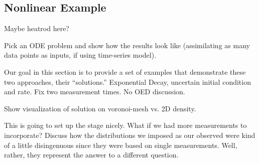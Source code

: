 \subsection{Nonlinear Example}
Maybe heatrod here?


Pick an ODE problem and show how the results look like (assimilating as many data points as inputs, if using time-series model).

Our goal in this section is to provide a set of examples that demonstrate these two approaches, their ``solutions.''
Exponential Decay, uncertain initial condition and rate. Fix two measurement times. No OED discussion.

Show visualization of solution on voronoi-mesh vs. 2D density.

This is going to set up the stage nicely.
What if we had more measurements to incorporate? Discuss how the distributions we imposed as our observed were kind of a little disingenuous since they were based on single measurements. Well, rather, they represent the answer to a different question.
